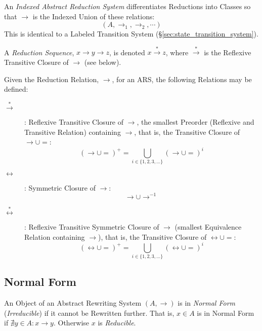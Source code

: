 An \emph{Indexed Abstract Reduction System} differentiates Reductions
into Classes so that $\rightarrow$ is the Indexed Union of these
relations:
\[
  (A, \rightarrow_1, \rightarrow_2, \cdots)
\]
This is identical to a Labeled Transition System
(\S\ref{sec:state_transition_system}).

A \emph{Reduction Sequence}, $x \rightarrow y \rightarrow z$, is
denoted $x \stackrel{*}\rightarrow z$, where $\stackrel{*}\rightarrow$
is the Reflexive Transitive Closure of $\rightarrow$ (see below).

Given the Reduction Relation, $\rightarrow$, for an ARS, the following
Relations may be defined:

\begin{description}

\item [$\stackrel{*}\rightarrow$]: Reflexive Transitive Closure of
  $\rightarrow$, the smallest Preorder (Reflexive and Transitive
  Relation) containing $\rightarrow$, that is, the Transitive Closure
  of $\rightarrow \cup =$:
  \[ (\rightarrow \cup =)^+ =
  \bigcup_{i \in \{1,2,3,...\}} (\rightarrow \cup =)^i \]

\item [$\leftrightarrow$]: Symmetric Closure of $\rightarrow$:
  \[ \rightarrow \cup \rightarrow^{-1} \]

\item [$\stackrel{*}\leftrightarrow$]: Reflexive Transitive
  Symmetric Closure of $\rightarrow$ (smallest Equivalence Relation
  containing $\rightarrow$), that is, the Transitive Closure of
  $\leftrightarrow \cup =$:
  \[ (\leftrightarrow \cup =)^+ =
  \bigcup_{i \in \{1,2,3,...\}} (\leftrightarrow \cup =)^i \]

\end{description}



\subsection{Normal Form}\label{sec:normal_form}

An Object of an Abstract Rewriting System $(A,\rightarrow)$ is in
\emph{Normal Form} (\emph{Irreducible}) if it cannot be Rewritten
further. That is, $x \in A$ is in Normal Form if $\nexists y \in A : x
\rightarrow y$. Otherwise $x$ is \emph{Reducible}.


